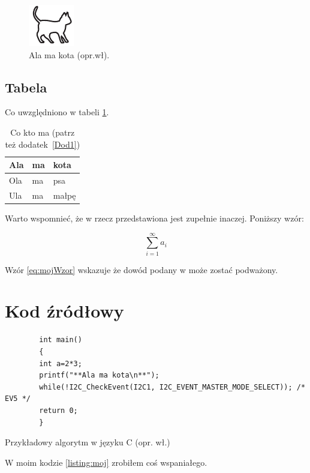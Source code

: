 \begin{figure}[H]
    \centering\includegraphics[width=.4\textwidth]{img/kotek}
    \caption{Ala ma kota (opr.wł).}\label{rysunek:kot}
\end{figure}

\subsection{Tabela}

Co uwzględniono w tabeli \ref{tabela:coktoma}. \lipsum[13-15]

\begin{table}[h!]
    \centering\caption{Co kto ma \cite{harel_rzecz_2008} (patrz też dodatek~\ref{Dod1}) \label{tabela:coktoma}}
    \begin{tabular}{|l|l|l|}%
        \hline
        Ala & ma & kota \\
        \hline
        Ola & ma & psa \\
        \hline
        Ula & ma & małpę\\
        \hline
    \end{tabular}
\end{table}

\lipsum[19-20] Warto wspomnieć, że w \cite{aizawa_groundwater_2009} rzecz przedstawiona jest zupełnie inaczej. Poniższy wzór:

\begin{equation}
    \sum_{i=1}^{\infty}a_i
    \label{eq:mojWzor}
\end{equation}

Wzór \ref{eq:mojWzor} wskazuje że dowód podany w \cite{kaleta_experimental_2005} może zostać podważony. \lipsum[9]

\section{Kod źródłowy}

\begin{listing}[h!]
    \begin{verbatim}
        int main()
        {
        int a=2*3;
        printf("**Ala ma kota\n**");
        while(!I2C_CheckEvent(I2C1, I2C_EVENT_MASTER_MODE_SELECT)); /* EV5 */
        return 0;
        }
    \end{verbatim}
    \caption{Przykładowy algorytm w języku C (opr. wł.)} \label{listing:moj}
\end{listing}

W moim kodzie \ref{listing:moj} zrobiłem coś wspaniałego. \lipsum[4]

\thispagestyle{normal}
